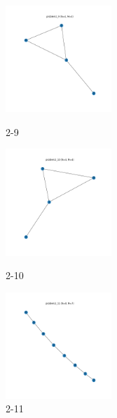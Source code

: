 \documentclass[a4paper, 10pt, dvipdfmx]{jlreq}
\begin{document}
\begin{figure}[htbp]
  \begin{minipage}{0.33\hsize}
    \begin{center}
      \includegraphics[width=40mm]{img_5/problem2_9.png}
    \end{center}
    \caption{2-9}
  \end{minipage}
  \begin{minipage}{0.33\hsize}
    \begin{center}
      \includegraphics[width=40mm]{img_5/problem2_10.png}
    \end{center}
    \caption{2-10}
  \end{minipage}
  \begin{minipage}{0.33\hsize}
    \begin{center}
      \includegraphics[width=40mm]{img_5/problem2_11.png}
    \end{center}
    \caption{2-11}
  \end{minipage}
\end{figure}
\end{document}
